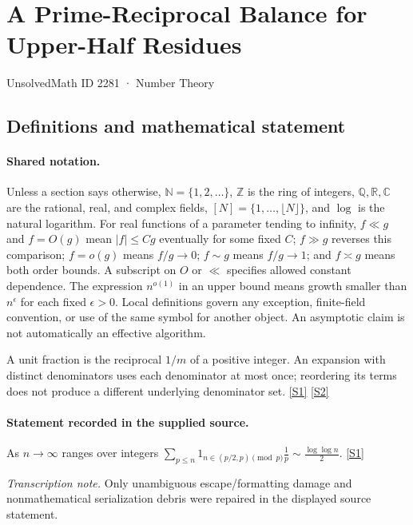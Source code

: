 \documentclass[11pt,a4paper]{article}
\newcommand{\N}{\mathbb{N}}
\newcommand{\Z}{\mathbb{Z}}
\newcommand{\Q}{\mathbb{Q}}
\newcommand{\R}{\mathbb{R}}
\newcommand{\C}{\mathbb{C}}
\newcommand{\sref}[2]{\hyperlink{source:#1:#2}{[S#2]}}
\begin{document}

\setcounter{section}{2280}

\section{A Prime-Reciprocal Balance for Upper-Half Residues}\label{2281}

{\small\sffamily UnsolvedMath ID 2281 · Number Theory}

\subsection{Definitions and mathematical statement}

\paragraph{Shared notation.}Unless a section says otherwise, $\N=\{1,2,\ldots\}$,
$\Z$ is the ring of integers, $\Q,\R,\C$ are the rational, real, and complex
fields, $[N]=\{1,\ldots,\lfloor N\rfloor\}$, and $\log$ is the natural
logarithm. For real functions of a parameter tending to infinity,
$f\ll g$ and $f=O(g)$ mean $|f|\leq Cg$ eventually for some fixed $C$;
$f\gg g$ reverses this comparison; $f=o(g)$ means $f/g\to0$;
$f\sim g$ means $f/g\to1$; and $f\asymp g$ means both order bounds.
A subscript on $O$ or $\ll$ specifies allowed constant dependence.
The expression $n^{o(1)}$ in an upper bound means growth smaller than
$n^\epsilon$ for each fixed $\epsilon>0$. Local definitions govern any
exception, finite-field convention, or use of the same symbol for another
object. An asymptotic claim is not automatically an effective algorithm.



A unit fraction is the reciprocal $1/m$ of a positive integer. An expansion with distinct denominators uses each denominator at most once; reordering its terms does not produce a different underlying denominator set. \sref{2281}{1} \sref{2281}{2}

\paragraph{Statement recorded in the supplied source.}
As $n\to \infty$ ranges over integers $ \sum_{p\leq n}1_{n\in (p/2,p)\pmod{p}}\frac{1}{p}\sim \frac{\log\log n}{2}. $ \sref{2281}{1}

{\small\emph{Transcription note.} Only unambiguous escape/formatting damage and nonmathematical serialization debris were repaired in the displayed source statement.}
\end{document}
